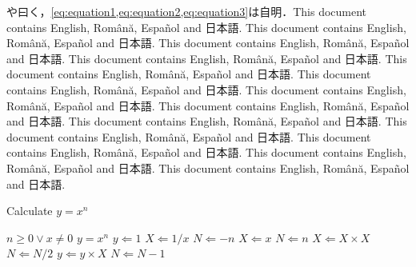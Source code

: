\documentclass[
	10pt,
	a4j,		%
	twocolumn,	%
	uplatex
]{jsarticle}
\renewcommand{\ref}{\cref}
\begin{document}
\citet{110001167075}や\citet{mr1763essay}曰く，\ref{eq:equation1,eq:equation2,eq:equation3}は自明．This document contains English, Română, Español and 日本語. This document contains English, Română, Español and 日本語. This document contains English, Română, Español and 日本語. This document contains English, Română, Español and 日本語. This document contains English, Română, Español and 日本語. This document contains English, Română, Español and 日本語. This document contains English, Română, Español and 日本語. This document contains English, Română, Español and 日本語. This document contains English, Română, Español and 日本語. This document contains English, Română, Español and 日本語. This document contains English, Română, Español and 日本語. This document contains English, Română, Español and 日本語. This document contains English, Română, Español and 日本語. 

\begin{algorithm}[t]
	\caption{Calculate $y = x^n$}
	\label{alg:algorithm}
	\begin{algorithmic}[1]
		\Require	$n \geq 0 \vee x \neq 0$
		\Ensure	$y = x^n$
		\State $y \Leftarrow 1$
				\State $X \Leftarrow 1 / x$
				\State $N \Leftarrow -n$
			\Else
				\State $X \Leftarrow x$
				\State $N \Leftarrow n$
			\EndIf
				\State $X \Leftarrow X \times X$
				\State $N \Leftarrow N / 2$
			\Else[$N$ is odd]
				\State $y \Leftarrow y \times X$
				\State $N \Leftarrow N - 1$
			\EndIf
		\EndWhile
	\end{algorithmic}
\end{algorithm}

{\footnotesize
	
	
	
	\makeatletter
	\renewcommand{\@biblabel}[1]{#1)}
	\makeatother
	
}
\end{document}
